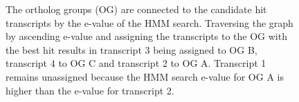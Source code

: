 \begin{figure}[t]
	\def\svgwidth{0.8\textwidth}
	
	\caption[Non-redundant assignment of ortholog relationships]{The ortholog groups (OG) are connected to
		the candidate hit transcripts by the e-value of the HMM search. Traversing
		the graph by ascending e-value and assigning the transcripts to the OG with
		the best hit results in transcript 3 being assigned to OG B, transcript 4 to
		OG C and transcript 2 to OG A. Transcript 1 remains unassigned because the
		HMM search e-value for OG A is higher than the e-value for transcript 2.}
	\label{fig:orthograph-graph}
\end{figure}

